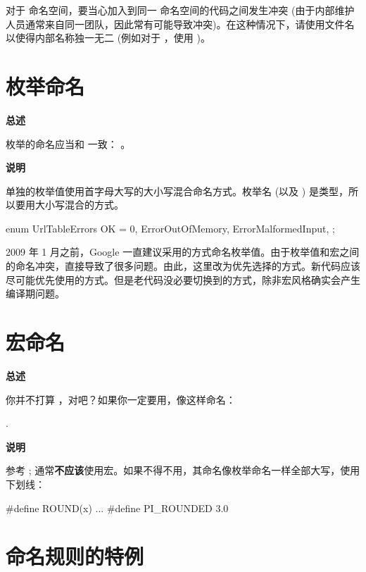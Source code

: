 对于  命名空间，要当心加入到同一  命名空间的代码之间发生冲突 (由于内部维护人员通常来自同一团队，因此常有可能导致冲突)。在这种情况下，请使用文件名以使得内部名称独一无二 (例如对于 ，使用 )。

\section{枚举命名}

\textbf{总述}

枚举的命名应当和  一致： 。

\textbf{说明}

单独的枚举值使用首字母大写的大小写混合命名方式。枚举名  (以及 ) 是类型，所以要用大小写混合的方式。

\begin{cppcode}
  enum UrlTableErrors {
      OK = 0,
      ErrorOutOfMemory,
      ErrorMalformedInput,
    };
\end{cppcode}

2009 年 1 月之前，Google 一直建议采用的方式命名枚举值。由于枚举值和宏之间的命名冲突，直接导致了很多问题。由此，这里改为优先选择的方式。新代码应该尽可能优先使用的方式。但是老代码没必要切换到的方式，除非宏风格确实会产生编译期问题。

\section{宏命名} \label{macro-names}

\textbf{总述}

你并不打算 ，对吧？如果你一定要用，像这样命名：

.

\textbf{说明}

参考 ; 通常\textbf{不应该}使用宏。如果不得不用，其命名像枚举命名一样全部大写，使用下划线：

\begin{cppcode}
  #define ROUND(x) ...
  #define PI_ROUNDED 3.0
\end{cppcode}

\section{命名规则的特例}

